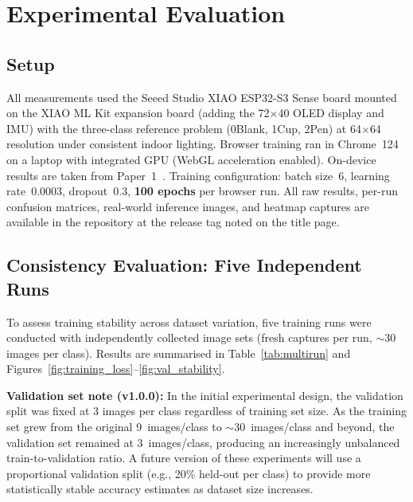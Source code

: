 \documentclass[11pt]{article}
\begin{document}
\section{Experimental Evaluation}

\subsection{Setup}

All measurements used the Seeed Studio XIAO ESP32-S3 Sense board mounted on the
XIAO ML Kit expansion board (adding the 72$\times$40 OLED display and IMU) with the three-class reference problem (0Blank, 1Cup, 2Pen) at 64$\times$64
resolution under consistent indoor lighting. Browser training ran in Chrome~124 on a laptop with integrated GPU
(WebGL acceleration enabled). On-device results are taken from
Paper~1~\cite{ellis2026ondevice}. Training configuration: batch size~6, learning
rate~0.0003, dropout~0.3, \textbf{100 epochs} per browser run. All raw results,
per-run confusion matrices, real-world inference images, and heatmap captures are
available in the repository at the release tag noted on the title page.

\subsection{Consistency Evaluation: Five Independent Runs}

To assess training stability across dataset variation, five training runs were
conducted with independently collected image sets (fresh captures per run, $\sim$30
images per class). Results are summarised in Table~\ref{tab:multirun} and
Figures~\ref{fig:training_loss}--\ref{fig:val_stability}.

\textbf{Validation set note (v1.0.0):} In the initial experimental design, the
validation split was fixed at 3 images per class regardless of training set size.
As the training set grew from the original 9~images/class to $\sim$30~images/class
and beyond, the validation set remained at 3~images/class, producing an increasingly
unbalanced train-to-validation ratio. A future version of these experiments will use
a proportional validation split (e.g., 20\% held-out per class) to provide more
statistically stable accuracy estimates as dataset size increases.
\end{document}
